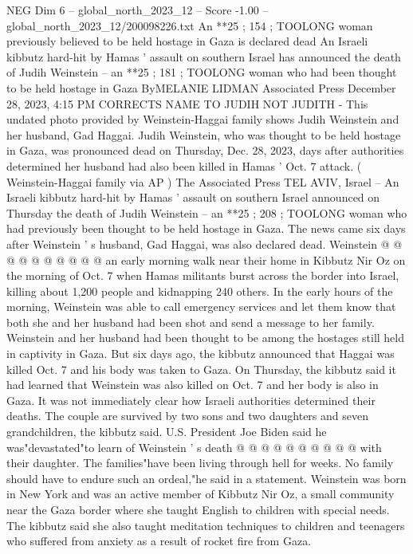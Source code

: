 \begin{textsample}{NEG Dim 6 – global\_north\_2023\_12 – Score -1.00 – global\_north\_2023\_12/200098226.txt}  \label{ex:f6_neg_323}
An **25 ; 154 ; TOOLONG woman previously believed to be held hostage in Gaza is declared dead An Israeli kibbutz hard-hit by Hamas ' assault on southern Israel has announced the death of Judih Weinstein -- an **25 ; 181 ; TOOLONG woman who had been thought to be held hostage in Gaza ByMELANIE LIDMAN Associated Press December 28, 2023, 4:15 PM CORRECTS NAME TO JUDIH NOT JUDITH - This undated photo provided by Weinstein-Haggai family shows Judih Weinstein and her husband, Gad Haggai.
Judih Weinstein, who was thought to be held hostage in Gaza, was pronounced dead on Thursday, Dec. 28, 2023, days after authorities determined her husband had also been killed in Hamas ' Oct. 7 attack. ( Weinstein-Haggai family via AP ) The Associated Press TEL AVIV, Israel -- An Israeli kibbutz hard-hit by Hamas ' assault on southern Israel announced on Thursday the death of Judih Weinstein -- an **25 ; 208 ; TOOLONG woman who had previously been thought to be held hostage in Gaza.
The news came six days after Weinstein ' s husband, Gad Haggai, was also declared dead.
Weinstein @ @ @ @ @ @ @ @ @ @ an early morning walk near their home in Kibbutz Nir Oz on the morning of Oct. 7 when Hamas militants burst across the border into Israel, killing about 1,200 people and kidnapping 240 others.
In the early hours of the morning, Weinstein was able to call emergency services and let them know that both she and her husband had been shot and send a message to her family.
Weinstein and her husband had been thought to be among the hostages still held in captivity in Gaza.
But six days ago, the kibbutz announced that Haggai was killed Oct. 7 and his body was taken to Gaza.
On Thursday, the kibbutz said it had learned that Weinstein was also killed on Oct. 7 and her body is also in Gaza.
It was not immediately clear how Israeli authorities determined their deaths.
The couple are survived by two sons and two daughters and seven grandchildren, the kibbutz said.
U.S.
President Joe Biden said he was"devastated"to learn of Weinstein ' s death @ @ @ @ @ @ @ @ @ @ with their daughter.
The families"have been living through hell for weeks.
No family should have to endure such an ordeal,"he said in a statement.
Weinstein was born in New York and was an active member of Kibbutz Nir Oz, a small community near the Gaza border where she taught English to children with special needs.
The kibbutz said she also taught meditation techniques to children and teenagers who suffered from anxiety as a result of rocket fire from Gaza.

\end{textsample}
